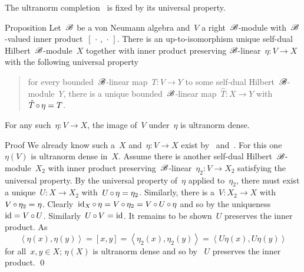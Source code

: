 \documentclass[b]{subfiles}
\begin{document}
\begin{parsec}%
\begin{point}%
The ultranorm completion~
    is fixed by its universal property.
\end{point}
\begin{point}{Proposition}%
Let~$\mathscr{B}$ be a von Neumann algebra and~$V$ a right~$\mathscr{B}$-module
    with~$\mathscr{B}$-valued inner product~$[\,\cdot\,,\,\cdot\,]$.
There is an up-to-isomorphism unique
    self-dual Hilbert~$\mathscr{B}$-module~$X$
    together with inner product preserving $\mathscr{B}$-linear~$\eta \colon V \to X$
    with the following universal property
    \begin{quote}
    for every bounded~$\mathscr{B}$-linear map~$T\colon V \to Y$
    to some self-dual Hilbert~$\mathscr{B}$-module~$Y$,
    there is a unique bounded~$\mathscr{B}$-linear map~$\hat{T}\colon X \to Y$
    with~$\hat{T} \mathop{\circ} \eta = T$.
    \end{quote}
For any such~$\eta\colon V \to X$,
    the image of~$V$ under~$\eta$ is ultranorm dense.
\begin{point}{Proof}%
We already know such a~$X$ and~$\eta\colon V \to X$
    exist by~
    and~.
For this one~$\eta(V)$ is ultranorm dense in~$X$.
Assume there is another self-dual Hilbert~$\mathscr{B}$-module~$X_2$
    with inner product preserving~$\mathscr{B}$-linear~$\eta_2\colon V \to X_2$
    satisfying the universal property.
By the universal property of~$\eta$ applied to~$\eta_2$,
    there must exist a unique~$U \colon X  \to X_2$
    with~$U \mathop{\circ} \eta  = \eta_2$.
Similarly, there is a~$V \colon X_2 \to X$
    with~$V \mathop{\circ} \eta_2 = \eta$.
Clearly~$\operatorname{id}_{X} \mathop{\circ} \eta = V \mathop{\circ} \eta_2 = V \mathop{\circ} U \mathop{\circ} \eta$
    and so by the uniqueness~$\operatorname{id} = V\mathop{\circ} U$.
    Similarly~$U \mathop{\circ} V = \operatorname{id}$.
It remains to be shown~$U$ preserves the inner product.
As
\begin{equation*}
    \left<\eta(x),\eta(y)\right>
    = [x,y]
    = \left<\eta_2(x), \eta_2(y)\right>
    = \left<U \eta(x), U \eta(y)\right>
\end{equation*}
for all~$x,y \in X$;
$\eta(X)$ is ultranorm dense
and so by~
    $U$ preserves the inner product.
\qed
\end{point}
\end{point}
\end{parsec}
\end{document}
